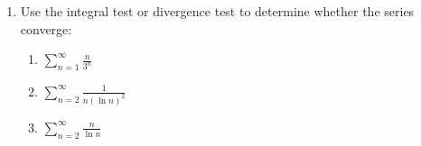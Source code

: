 \documentclass[11pt,fleqn]{article}
\begin{document}
\begin{enumerate}
\item Use the integral test or divergence test to determine whether the series converge:
	\begin{enumerate}
	\item  $\displaystyle{\sum_{n=1}^\infty \frac{n}{3^n}}$
	\vfill
	\item  $\displaystyle{\sum_{n=2}^\infty \frac{1}{n (\ln n)^2}}$
	\vfill
	\item  $\displaystyle{\sum_{n=2}^\infty \frac{n}{\ln n}}$
	\vfill
	\end{enumerate}
\end{enumerate}
\end{document}
